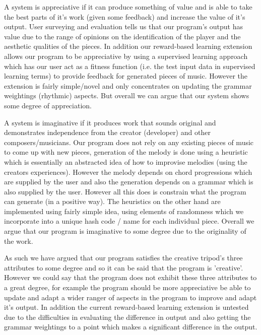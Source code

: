 \documentclass[pdftex,12pt,a4paper]{report}
\begin{document}
A system is appreciative if it can produce something of value and is able to take the best parts of it's work (given some feedback) and increase the value of it's output. User surveying and evaluation tells us that our program's output has value due to the range of opinions on the identification of the player and the aesthetic qualities of the pieces. In addition our reward-based learning extension allows our program to be appreciative by using a supervised learning approach which has our user act as a fitness function (i.e. the test input data in supervised learning terms) to provide feedback for generated pieces of music. However the extension is fairly simple/novel and only concentrates on updating the grammar weightings (rhythmic) aspects. But overall we can argue that our system shows some degree of appreciation. 

A system is imaginative if it produces work that sounds original and demonstrates independence from the creator (developer) and other composers/musicians. Our program does not rely on any existing pieces of music to come up with new pieces, generation of the melody is done using a heuristic which is essentially an abstracted idea of how to improvise melodies (using the creators experiences). However the melody depends on chord progressions which are supplied by the user and also the generation depends on a grammar which is also supplied by the user. However all this does is constrain what the program can generate (in a positive way). The heuristics on the other hand are implemented using fairly simple idea, using elements of randomness which we incorporate into a unique hash code / name for each individual piece. Overall we argue that our program is imaginative to some degree due to the originality of the work.

As such we have argued that our program satisfies the creative tripod's three attributes to some degree and so it can be said that the program is 'creative'. However we could say that the program does not exhibit these three attributes to a great degree, for example the program should be more appreciative be able to update and adapt a wider ranger of aspects in the program to improve and adapt it's output. In addition the current reward-based learning extension is untested due to the difficulties in evaluating the difference in output and also getting the grammar weightings to a point which makes a significant difference in the output.
\end{document}
